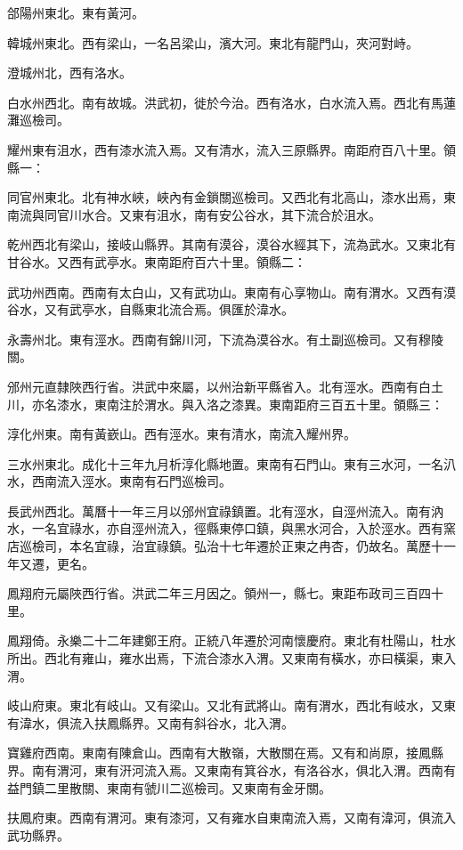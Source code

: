 郃陽州東北。東有黃河。

韓城州東北。西有梁山，一名呂梁山，濱大河。東北有龍門山，夾河對峙。

澄城州北，西有洛水。

白水州西北。南有故城。洪武初，徙於今治。西有洛水，白水流入焉。西北有馬蓮灘巡檢司。

耀州東有沮水，西有漆水流入焉。又有清水，流入三原縣界。南距府百八十里。領縣一：

同官州東北。北有神水峽，峽內有金鎖關巡檢司。又西北有北高山，漆水出焉，東南流與同官川水合。又東有沮水，南有安公谷水，其下流合於沮水。

乾州西北有梁山，接岐山縣界。其南有漠谷，漠谷水經其下，流為武水。又東北有甘谷水。又西有武亭水。東南距府百六十里。領縣二：

武功州西南。西南有太白山，又有武功山。東南有心享物山。南有渭水。又西有漠谷水，又有武亭水，自縣東北流合焉。俱匯於湋水。

永壽州北。東有涇水。西南有錦川河，下流為漠谷水。有土副巡檢司。又有穆陵關。

邠州元直隸陜西行省。洪武中來屬，以州治新平縣省入。北有涇水。西南有白土川，亦名漆水，東南注於渭水。與入洛之漆異。東南距府三百五十里。領縣三：

淳化州東。南有黃嶔山。西有涇水。東有清水，南流入耀州界。

三水州東北。成化十三年九月析淳化縣地置。東南有石門山。東有三水河，一名汃水，西南流入涇水。東南有石門巡檢司。

長武州西北。萬曆十一年三月以邠州宜祿鎮置。北有涇水，自涇州流入。南有汭水，一名宜祿水，亦自涇州流入，徑縣東停口鎮，與黑水河合，入於涇水。西有窯店巡檢司，本名宜祿，治宜祿鎮。弘治十七年遷於正東之冉杏，仍故名。萬歷十一年又遷，更名。

鳳翔府元屬陜西行省。洪武二年三月因之。領州一，縣七。東距布政司三百四十里。

鳳翔倚。永樂二十二年建鄭王府。正統八年遷於河南懷慶府。東北有杜陽山，杜水所出。西北有雍山，雍水出焉，下流合漆水入渭。又東南有橫水，亦曰橫渠，東入渭。

岐山府東。東北有岐山。又有梁山。又北有武將山。南有渭水，西北有岐水，又東有湋水，俱流入扶鳳縣界。又南有斜谷水，北入渭。

寶雞府西南。東南有陳倉山。西南有大散嶺，大散關在焉。又有和尚原，接鳳縣界。南有渭河，東有汧河流入焉。又東南有箕谷水，有洛谷水，俱北入渭。西南有益門鎮二里散關、東南有虢川二巡檢司。又東南有金牙關。

扶鳳府東。西南有渭河。東有漆河，又有雍水自東南流入焉，又南有湋河，俱流入武功縣界。

